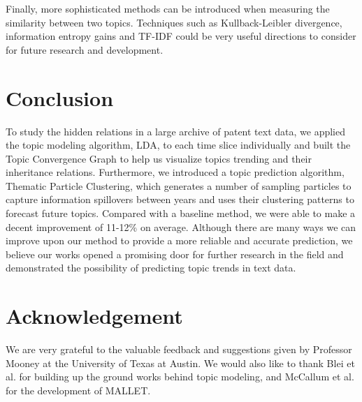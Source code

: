 \documentclass[conference]{IEEEtran}
\begin{document}
Finally, more sophisticated methods can be introduced when measuring the similarity between two topics. Techniques such as Kullback-Leibler divergence, information entropy gains and TF-IDF could be very useful directions to consider for future research and development. 

\section{Conclusion}

To study the hidden relations in a large archive of patent text data, we applied the topic modeling algorithm, LDA, to each time slice individually and built the Topic Convergence Graph to help us visualize topics trending and their inheritance relations. Furthermore, we introduced a topic prediction algorithm, Thematic Particle Clustering, which generates a number of sampling particles to capture information spillovers between years and uses their clustering patterns to forecast future topics. Compared with a baseline method, we were able to make a decent improvement of 11-12\% on average. Although there are many ways we can improve upon our method to provide a more reliable and accurate prediction, we believe our works opened a promising door for further research in the field and demonstrated the possibility of predicting topic trends in text data.


\section{Acknowledgement}

We are very grateful to the valuable feedback and suggestions given by Professor Mooney at the University of Texas at Austin. We would also like to thank Blei et al. for building up the ground works behind topic modeling, and McCallum et al. for the development of MALLET.
\end{document}
